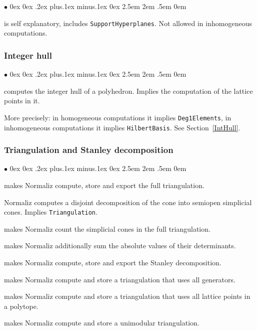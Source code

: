 \documentclass[12pt,a4paper]{scrartcl}
\newcommand{\stdli}{ \topsep0ex \partopsep0ex %
\parsep.2ex plus.1ex minus.1ex \itemsep0ex%
\leftmargin2.5em \labelwidth2em \labelsep.5em \rightmargin0em}%
\renewenvironment{itemize}{\begin{list}{{$\bullet$}}{\stdli}}{\end{list}}
\theoremstyle{definition}
\def\itemtt[#1]{\item[\textbf{\ttt{#1}}]}
\def\ttt{\texttt}
\begin{document}
\begin{itemize}
	\itemtt [ClassGroup, -C] is self explanatory, includes \verb|SupportHyperplanes|. Not allowed in inhomogeneous computations.
\end{itemize}

\subsubsection{Integer hull}

\begin{itemize}
	\itemtt [IntegerHull, -H] computes the integer hull of a polyhedron. Implies the computation of the lattice points in it.
\end{itemize}

More precisely: in homogeneous computations it implies \verb|Deg1Elements|, in inhomogeneous computations it implies \verb|HilbertBasis|. See Section~\ref{IntHull}.

\subsubsection{Triangulation and Stanley decomposition}

\begin{itemize}
	
	\itemtt[Triangulation, -T] makes Normaliz compute, store and export the full triangulation.
	
	\itemtt[ConeDecomposition, -D] Normaliz computes a disjoint decomposition of the cone into semiopen simplicial cones. Implies \verb|Triangulation|.
	
	\itemtt[TriangulationSize, -t] makes Normaliz count the simplicial cones in the full triangulation.
	
	\itemtt[TriangulationDetSum] makes Normaliz additionally sum the absolute values of their determinants.
	
	\itemtt[StanleyDec, -y] makes Normaliz compute, store and export the Stanley decomposition.
	
	\itemtt[AllGeneratorsTriangulation] makes Normaliz compute and store a triangulation that uses all generators.
	
	\itemtt[LatticePointTriangulation] makes Normaliz compute and store a triangulation that uses all lattice points in a polytope.
	
	\itemtt[UnimodularTriangulation] makes Normaliz compute and store a unimodular triangulation.
	
\end{itemize}
\end{document}
